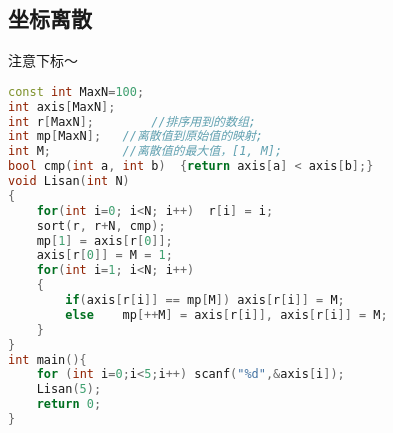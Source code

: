 \subsection{坐标离散}
	注意下标～\\
		\begin{lstlisting}[language=c++]
const int MaxN=100;
int axis[MaxN];
int r[MaxN];		//排序用到的数组;
int mp[MaxN];	//离散值到原始值的映射;
int M;			//离散值的最大值，[1, M];
bool cmp(int a, int b)	{return axis[a] < axis[b];}
void Lisan(int N)
{
	for(int i=0; i<N; i++)	r[i] = i;
	sort(r, r+N, cmp);
	mp[1] = axis[r[0]];
	axis[r[0]] = M = 1;
	for(int i=1; i<N; i++)
	{
		if(axis[r[i]] == mp[M])	axis[r[i]] = M;
		else	mp[++M] = axis[r[i]], axis[r[i]] = M;	
	}	
}
int main(){
	for (int i=0;i<5;i++) scanf("%d",&axis[i]);
	Lisan(5);
	return 0;
}
	\end{lstlisting}